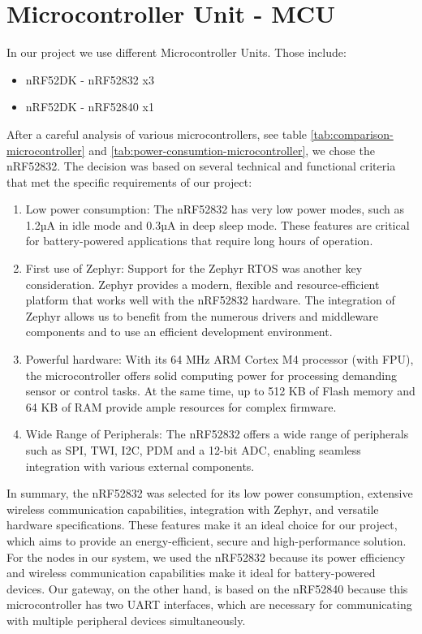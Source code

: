 \section{Microcontroller Unit - MCU}
In our project we use different Microcontroller Units. Those include:
\begin{itemize}
    \item nRF52DK - nRF52832 x3
    \item nRF52DK - nRF52840 x1
\end{itemize}

After a careful analysis of various microcontrollers, see table \ref{tab:comparison-microcontroller} and \ref{tab:power-consumtion-microcontroller}, we chose the nRF52832. The decision was based on several technical and functional criteria that met the specific requirements of our project:

\begin{enumerate}
    \item Low power consumption: The nRF52832 has very low power modes, such as 1.2µA in idle mode and 0.3µA in deep sleep mode. These features are critical for battery-powered applications that require long hours of operation.

    \item First use of Zephyr: Support for the Zephyr RTOS was another key consideration. Zephyr provides a modern, flexible and resource-efficient platform that works well with the nRF52832 hardware. The integration of Zephyr allows us to benefit from the numerous drivers and middleware components and to use an efficient development environment.
    
    \item Powerful hardware: With its 64 MHz ARM Cortex M4 processor (with FPU), the microcontroller offers solid computing power for processing demanding sensor or control tasks. At the same time, up to 512 KB of Flash memory and 64 KB of RAM provide ample resources for complex firmware.
    
    \item Wide Range of Peripherals: The nRF52832 offers a wide range of peripherals such as SPI, TWI, I2C, PDM and a 12-bit ADC, enabling seamless integration with various external components.
\end{enumerate}

In summary, the nRF52832 was selected for its low power consumption, extensive wireless communication capabilities, integration with Zephyr, and versatile hardware specifications. These features make it an ideal choice for our project, which aims to provide an energy-efficient, secure and high-performance solution.
\break
\newline
For the nodes in our system, we used the nRF52832 because its power efficiency and wireless communication capabilities make it ideal for battery-powered devices. Our gateway, on the other hand, is based on the nRF52840 because this microcontroller has two UART interfaces, which are necessary for communicating with multiple peripheral devices simultaneously.


